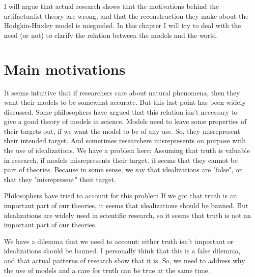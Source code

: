 I will argue that actual research shows that the motivations behind the artifactualist theory are wrong, and that the reconstruction they make about the Hodgkin-Huxley model is misguided.
In this chapter I will try to deal with the need (or not) to clarify the relation between the models and the world.

\section{Main motivations}

It seems intuitive that if researchers care about natural phenomena, then they want their models to be somewhat accurate.
But this last point has been widely discussed.
Some philosophers have argued that this relation isn't necessary to give a good theory of models in science.
Models need to leave some properties of their targets out, if we want the model to be of any use. %
So, they misrepresent their intended target.
And sometimes researchers misrepresents on purpose with the use of idealizations. %
We have a problem here: Assuming that truth is valuable in research, if models misrepresents their target, it seems that they cannot be part of theories.
Because in some sense, we say that idealizations are "false", or that they "misrepresent" their target.

Philosophers have tried to account for this problem
If we got that truth is an important part of our theories, it seems that idealizations should be banned.
But idealizations are widely used in scientific research, so it seems that truth is not an important part of our theories.

We have a dilemma that we need to account: either truth isn't important or idealizations should be banned.
I personally think that this is a false dilemma, and that actual patterns of research show that it is.
So, we need to address why the use of models and a care for truth can be true at the same time.

